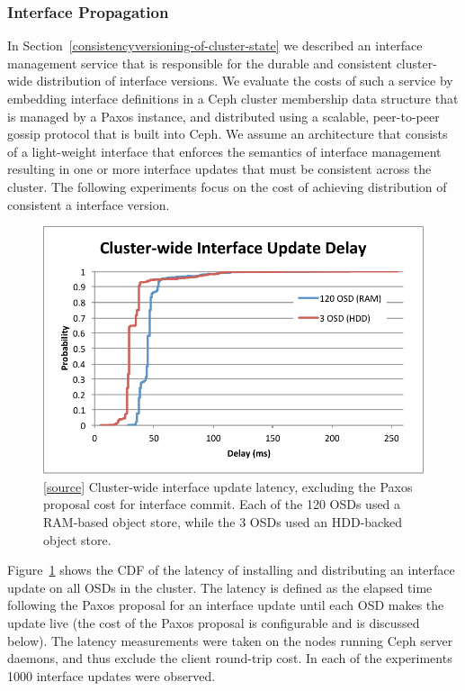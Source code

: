 \documentclass[preprint]{sigplanconf-eurosys}
\begin{document}
\subsubsection{Interface Propagation}

In Section~\ref{consistencyversioning-of-cluster-state} we described an
interface management service that is responsible for the durable and
consistent cluster-wide distribution of interface versions. We evaluate the
costs of such a service by embedding interface definitions in a Ceph cluster
membership data structure that is managed by a Paxos instance, and distributed
using a scalable, peer-to-peer gossip protocol that is built into Ceph. We
assume an architecture that consists of a light-weight interface that enforces
the semantics of interface management resulting in one or more interface
updates that must be consistent across the cluster. The following experiments
focus on the cost of achieving distribution of consistent a interface version.

\begin{figure}[h]
\centering
\includegraphics[trim={1 4 4 1.3cm},clip]{figures/iface-update-delay.pdf}
\caption{[\href{https://github.com/double-blind-submitter/osdi16}{source}]
Cluster-wide interface update latency, excluding the Paxos proposal cost for
interface commit. Each of the 120 OSDs used a RAM-based object store, while the
3 OSDs used an HDD-backed object store.}
\label{fig:propdelay}
\end{figure}

Figure~\ref{fig:propdelay} shows the CDF of the latency of installing and
distributing an interface update on all OSDs in the cluster. The latency is
defined as the elapsed time following the Paxos proposal for an interface
update until each OSD makes the update live (the cost of the Paxos proposal is
configurable and is discussed below). The latency measurements were taken on
the nodes running Ceph server daemons, and thus exclude the client round-trip
cost. In each of the experiments 1000 interface updates were observed.
\end{document}
